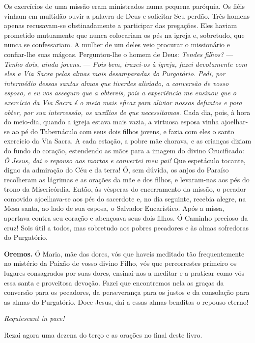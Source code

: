 Os exercícios de uma missão eram ministrados numa pequena paróquia. Os fiéis vinham em multidão ouvir a palavra de Deus e solicitar Seu perdão. Três homens apenas recusavam-se obstinadamente a participar das pregações. Eles haviam prometido mutuamente que nunca colocariam os pés na igreja e, sobretudo, que nunca se confessariam. A mulher de um deles veio procurar o missionário e confiar-lhe suas mágoas. Perguntou-lhe o homem de Deus: \textit{Tendes filhos?}  --- \textit{Tenho dois, ainda jovens.} --- \textit{Pois bem, trazei-os à igreja, fazei devotamente com eles a Via Sacra pelas almas mais desamparadas do Purgatório. Pedi, por intermédio dessas santas almas que tiverdes aliviado, a conversão de vosso esposo, e eu vos asseguro que a obtereis, pois a experiência me ensinou que o exercício da Via Sacra é o meio mais eficaz para aliviar nossos defuntos e para obter, por sua intercessão, os auxílios de que necessitamos.} Cada dia, pois, à hora do meio-dia, quando a igreja estava mais vazia, a virtuosa esposa vinha ajoelhar-se ao pé do Tabernáculo com seus dois filhos jovens, e fazia com eles o santo exercício da Via Sacra. A cada estação, a pobre mãe chorava, e as crianças diziam do fundo do coração, estendendo as mãos para a imagem do divino Crucificado: \textit{Ó Jesus, dai o repouso aos mortos e convertei meu pai!} Que espetáculo tocante, digno da admiração do Céu e da terra! Ó, sem dúvida, os anjos do Paraíso recolheram as lágrimas e as orações da mãe e dos filhos, e levaram-nas aos pés do trono da Misericórdia. Então, às vésperas do encerramento da missão, o pecador comovido ajoelhava-se aos pés do sacerdote e, no dia seguinte, recebia alegre, na Mesa santa, ao lado de sua esposa, o Salvador Eucarístico. Após a missa, apertava contra seu coração e abençoava seus dois filhos. Ó Caminho precioso da cruz! Sois útil a todos, mas sobretudo aos pobres pecadores e às almas sofredoras do Purgatório.


\vspace{\baselineskip}\noindent \textbf{Oremos.} Ó Maria, mãe das dores, vós que haveis meditado tão frequentemente no mistério da Paixão de vosso divino Filho, vós que percorrestes primeiro os lugares consagrados por suas dores, ensinai-nos a meditar e a praticar como vós essa santa e proveitosa devoção. Fazei que encontremos nela as graças da conversão para os pecadores, da perseverança para os justos e da consolação para as almas do Purgatório. Doce Jesus, dai a essas almas benditas o repouso eterno!



\begin{center}
\textit{Requiescant in pace!}
\end{center}

Rezai agora uma dezena do terço e as orações no final deste livro.
